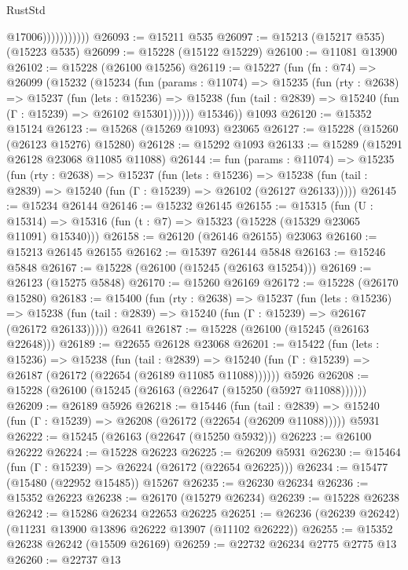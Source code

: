 \begin{lexlean}{RustStd}
\begin{coremodule}
                          @17006)))))))))))
@26093 := @15211 @535
@26097 := @15213 (@15217 @535) (@15223 @535)
@26099 := @15228 (@15122 @15229)
@26100 := @11081 @13900
@26102 := @15228 (@26100 @15256)
@26119 := @15227
    (fun (fn : @74) =>
    @26099
      (@15232
        (@15234
          (fun (params : @11074) =>
          @15235
            (fun (rty : @2638) =>
            @15237
              (fun (lets : @15236) =>
              @15238 (fun (tail : @2839) => @15240 (fun (Γ : @15239) => @26102 @15301))))))
        @15346))
    @1093
@26120 := @15352 @15124
@26123 := @15268 (@15269 @1093) @23065
@26127 := @15228 (@15260 (@26123 @15276) @15280)
@26128 := @15292 @1093
@26133 := @15289 (@15291 @26128 @23068 @11085 @11088)
@26144 := fun (params : @11074) =>
  @15235
    (fun (rty : @2638) =>
    @15237
      (fun (lets : @15236) =>
      @15238 (fun (tail : @2839) => @15240 (fun (Γ : @15239) => @26102 (@26127 @26133)))))
@26145 := @15234 @26144
@26146 := @15232 @26145
@26155 := @15315
    (fun (U : @15314) => @15316 (fun (t : @7) => @15323 (@15228 (@15329 @23065 @11091) @15340)))
@26158 := @26120 (@26146 @26155) @23063
@26160 := @15213 @26145 @26155
@26162 := @15397 @26144 @5848
@26163 := @15246 @5848
@26167 := @15228 (@26100 (@15245 (@26163 @15254)))
@26169 := @26123 (@15275 @5848)
@26170 := @15260 @26169
@26172 := @15228 (@26170 @15280)
@26183 := @15400
    (fun (rty : @2638) =>
    @15237
      (fun (lets : @15236) =>
      @15238 (fun (tail : @2839) => @15240 (fun (Γ : @15239) => @26167 (@26172 @26133)))))
    @2641
@26187 := @15228 (@26100 (@15245 (@26163 @22648)))
@26189 := @22655 @26128 @23068
@26201 := @15422
    (fun (lets : @15236) =>
    @15238
      (fun (tail : @2839) =>
      @15240 (fun (Γ : @15239) => @26187 (@26172 (@22654 (@26189 @11085 @11088))))))
    @5926
@26208 := @15228 (@26100 (@15245 (@26163 (@22647 (@15250 (@5927 @11088))))))
@26209 := @26189 @5926
@26218 := @15446
    (fun (tail : @2839) => @15240 (fun (Γ : @15239) => @26208 (@26172 (@22654 (@26209 @11088)))))
    @5931
@26222 := @15245 (@26163 (@22647 (@15250 @5932)))
@26223 := @26100 @26222
@26224 := @15228 @26223
@26225 := @26209 @5931
@26230 := @15464 (fun (Γ : @15239) => @26224 (@26172 (@22654 @26225)))
@26234 := @15477 (@15480 (@22952 @15485)) @15267
@26235 := @26230 @26234
@26236 := @15352 @26223
@26238 := @26170 (@15279 @26234)
@26239 := @15228 @26238
@26242 := @15286 @26234 @22653 @26225
@26251 := @26236 (@26239 @26242) (@11231 @13900 @13896 @26222 @13907 (@11102 @26222))
@26255 := @15352 @26238 @26242 (@15509 @26169)
@26259 := @22732 @26234 @2775 @2775 @13
@26260 := @22737 @13

\end{coremodule}
\end{lexlean}
